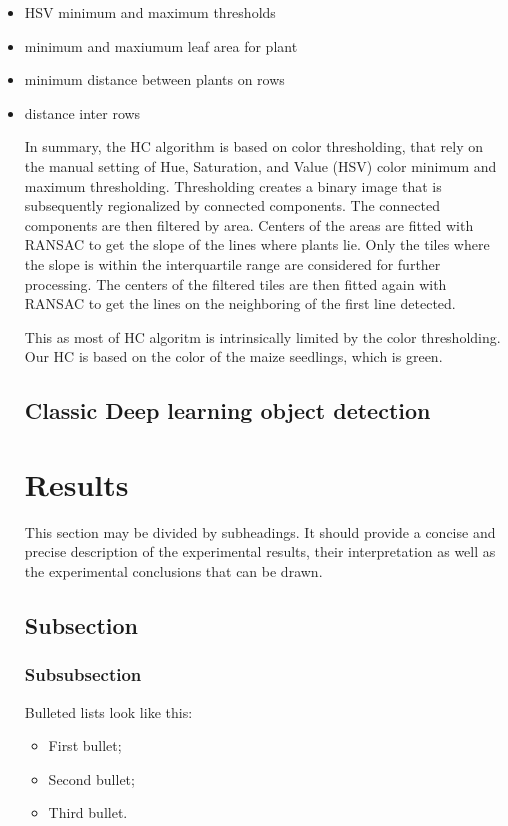 \documentclass[journal,article,submit,pdftex,moreauthors]{Definitions/mdpi}
\begin{document}
\begin{itemize}
    \item HSV minimum and maximum thresholds
    \item minimum and maxiumum leaf area for plant
    \item minimum distance between plants on rows
    \item distance inter rows

In summary, the HC algorithm is based on color thresholding, that rely on the
manual setting of Hue, Saturation, and Value (HSV) color minimum and maximum
thresholding. Thresholding creates a binary image that is subsequently regionalized
by connected components. The connected components are then filtered by area.
Centers of the areas are fitted with RANSAC to get the slope of the lines where
plants lie. Only the tiles where the slope is within the interquartile range are
considered for further processing. The centers of the filtered tiles are then fitted
again with RANSAC to get the lines on the neighboring of the first line detected.

This as most of HC algoritm is intrinsically limited by the color thresholding.
Our HC is based on the color of the maize seedlings, which is green.



\subsection{Classic Deep learning object detection}

\section{Results}

This section may be divided by subheadings. It should provide a concise and precise description of the experimental results, their interpretation as well as the experimental conclusions that can be drawn.
\subsection{Subsection}
\subsubsection{Subsubsection}

Bulleted lists look like this:
\begin{itemize}
\item	First bullet;
\item	Second bullet;
\item	Third bullet.
\end{itemize}


\end{itemize}
\end{document}
